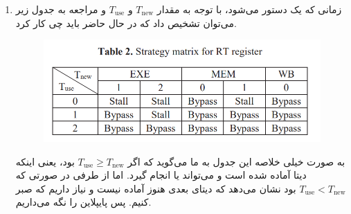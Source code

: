 \begin{enumerate}
    \item زمانی که یک دستور
    می‌شود، با توجه به مقدار
    $T_{\text{new}}$
    و
    $T_{\text{use}}$
    و مراجعه به جدول زیر می‌توان تشخیص داد که در حال حاضر باید چی کار کرد.
    \begin{figure}[H]
        \centering
        \includegraphics[scale=0.5]{pics/StrategyMatrix.png}
    \end{figure}
    به صورت خیلی خلاصه این جدول به ما می‌گوید که اگر
    $T_{\text{use}} \ge T_{\text{new}}$
    بود، یعنی اینکه دیتا آماده شده است و می‌تواند
     یا 
    انجام گیرد. اما از طرفی در صورتی که
    $T_{\text{use}} < T_{\text{new}}$
    بود نشان می‌دهد که دیتای بعدی هنوز آماده نیست و نیاز داریم که صبر کنیم. پس پایپلاین را نگه می‌داریم.
\end{enumerate}